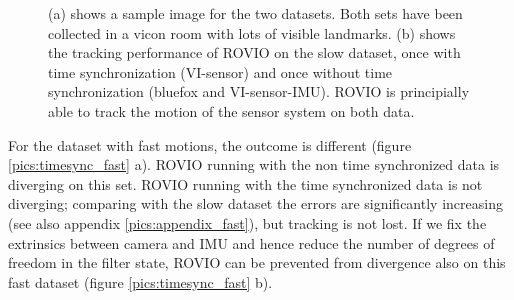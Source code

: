 \begin{figure}
\begin{subfigure}[b]{0.42\textwidth}
    \caption{}
  \end{subfigure}
   \caption{(a) shows a sample image for the two datasets. Both sets have been collected in a vicon room with lots of visible landmarks. (b) shows the tracking performance of ROVIO on the slow dataset, once with time synchronization (VI-sensor) and once without time synchronization (bluefox and VI-sensor-IMU). ROVIO is principially able to track the motion of the sensor system on both data.}
   \label{pics:timesync_slow}
\end{figure}

For the dataset with fast motions, the outcome is different (figure \ref{pics:timesync_fast} a). ROVIO running with the non time synchronized data is diverging on this set. ROVIO running with the time synchronized data is not diverging; comparing with the slow dataset the errors are significantly increasing (see also appendix \ref{pics:appendix_fast}), but tracking is not lost. If we fix the extrinsics between camera and IMU and hence reduce the number of degrees of freedom in the filter state, ROVIO can be prevented from divergence also on this fast dataset (figure \ref{pics:timesync_fast} b). \\

